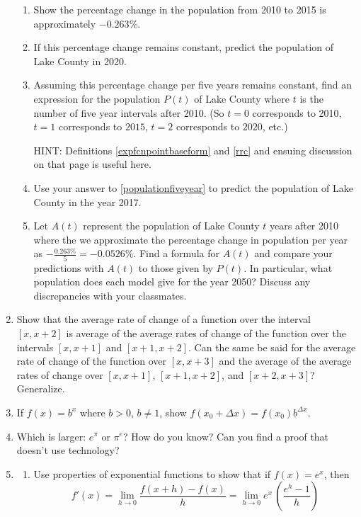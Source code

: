 \documentclass{ximera}
\begin{document}
\begin{enumerate}
\begin{enumerate}
\item  Show the percentage change in the population from 2010 to 2015 is approximately $-0.263 \%$.

\item  If this percentage change remains constant, predict the population of Lake County in 2020.

\item  \label{populationfiveyear} Assuming this percentage change per five years remains constant, find an expression for the population $P(t)$ of Lake County where $t$ is the number of five year intervals after 2010.  (So $t = 0$ corresponds to 2010, $t = 1$ corresponds to $2015$, $t = 2$ corresponds to $2020$, etc.)

HINT:  Definitions \ref{expfcnpointbaseform} and \ref{rrc} and ensuing discussion on that page is useful here.

\item  Use your answer to  \ref{populationfiveyear}  to predict the population of Lake County in the year 2017.  

\item  Let $A(t)$  represent the population of Lake County $t$ years after 2010 where the we approximate the percentage change in population per year as $-\frac{0.263 \%}{5} = -0.0526 \%$.    Find a formula for $A(t)$ and compare your predictions with $A(t)$ to those given by $P(t)$.  In particular, what population does each model give for the year 2050?  Discuss any discrepancies with your classmates.

\end{enumerate}


\item \label{averageofarc}  Show that the average rate of change of a function over the interval  $[x, x+2]$ is average of the average rates of change of the function over the intervals $[x,x+1]$ and $[x+1, x+2]$.  Can the same be said for the average rate of change of the function over $[x, x+3]$ and the average of the average rates of change over $[x, x+1]$, $[x+1, x+2]$, and $[x+2, x+3]$?  Generalize.

\item \label{exponentialchangeexercise}  If $f(x) = b^{x}$ where $b>0$, $b \neq 1$,  show $f(x_{0}+\Delta x) = f(x_{0}) b^{\Delta x}$.


\item Which is larger: $e^{\pi}$ or $\pi^{e}$?  How do you know?  Can you find a proof that doesn't use technology?


\item\label{derivativeofex} \begin{enumerate}  \item\label{diffquotex}  Use properties of exponential functions to show that if $f(x) = e^{x}$, then \[ f'(x) = \lim_{h \rightarrow 0} \frac{f(x+h) - f(x)}{h} = \lim_{h \rightarrow 0} e^{x} \, \left( \frac{e^{h} - 1}{h} \right)\]


\end{enumerate}
\end{enumerate}
\end{document}
